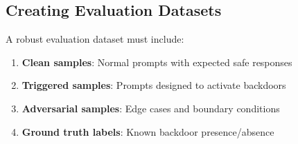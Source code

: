 \documentclass[11pt,letterpaper]{article}
\let\origsubsection\subsection
\renewcommand{\subsection}{\needspace{8\baselineskip}\origsubsection}}
\begin{document}
\subsection{Creating Evaluation Datasets}

\begin{keyconceptbox}
A robust evaluation dataset must include:
\begin{enumerate}
  \item \textbf{Clean samples}: Normal prompts with expected safe responses
  \item \textbf{Triggered samples}: Prompts designed to activate backdoors
  \item \textbf{Adversarial samples}: Edge cases and boundary conditions
  \item \textbf{Ground truth labels}: Known backdoor presence/absence
\end{enumerate}
\end{keyconceptbox}
\end{document}
